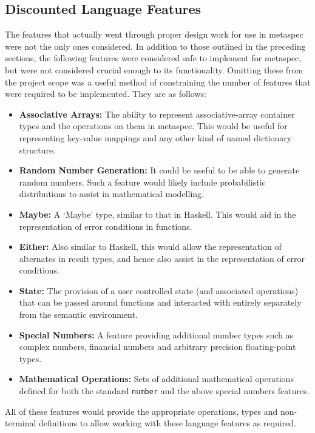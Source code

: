 \subsection{Discounted Language Features} %
\label{sub:discounted_language_features}
The features that actually went through proper design work for use in \gls{metaspec} were not the only ones considered. 
In addition to those outlined in the preceding sections, the following features were considered safe to implement for \gls{metaspec}, but were not considered crucial enough to its functionality.
Omitting these from the project scope was a useful method of constraining the number of features that were required to be implemented.
They are as follows:
\begin{itemize}
    \item \textbf{Associative Arrays:} The ability to represent associative-array container types and the operations on them in metaspec. 
    This would be useful for representing key-value mappings and any other kind of named dictionary structure.
    \item \textbf{Random Number Generation:} It could be useful to be able to generate random numbers.
    Such a feature would likely include probabilistic distributions to assist in mathematical modelling.
    \item \textbf{Maybe:} A `Maybe' type, similar to that in Haskell.
    This would aid in the representation of error conditions in functions.
    \item \textbf{Either:} Also similar to Haskell, this would allow the representation of alternates in result types, and hence also assist in the representation of error conditions.
    \item \textbf{State:} The provision of a user controlled state (and associated operations) that can be passed around functions and interacted with entirely separately from the semantic environment.
    \item \textbf{Special Numbers:} A feature providing additional number types such as complex numbers, financial numbers and arbitrary precision floating-point types.
    \item \textbf{Mathematical Operations:} Sets of additional mathematical operations defined for both the standard \texttt{number} and the above special numbers features. 
\end{itemize}

All of these features would provide the appropriate operations, types and non-terminal definitions to allow working with these language features as required. 



